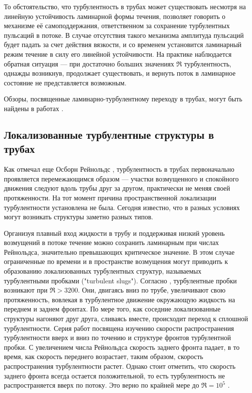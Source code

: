 То обстоятельство, что турбулентность в трубах может существовать несмотря на линейную устойчивость ламинарной формы течения, позволяет говорить о механизме её самоподдержания, ответственном за сохранение турбулентных пульсаций в потоке. В случае отсутствия такого механизма амплитуда пульсаций будет падать за счет действия вязкости, и со временем установится ламинарный режим течение в силу его линейной устойчивости. На практике наблюдается обратная ситуация --- при достаточно больших значениях $\Re$ турбулентность, однажды возникнув, продолжает существовать, и вернуть поток в ламинарное состояние не представляется возможным. 

Обзоры, посвященные ламинарно-турбулентному переходу в трубах, могут быть найдены в работах \cite{Kerswell2005, Eckhardt2007, Manneville2015, Manneville2016, Kreilos2014, Barkley2016}.



	\subsection{Локализованные турбулентные структуры в трубах} \label{local_structures}

Как отмечал еще Осборн Рейнольдс \cite{Reynolds1883}, турбулентность в трубах первоначально проявляется перемежающимся образом --- участки возмущенного и спокойного движения следуют вдоль трубы друг за другом, практически не меняя своей протяженности. На тот момент причина пространственной локализации турбулентности установлена не была. Сегодня известно, что в разных условиях могут возникать структуры заметно разных типов. 

Организуя плавный вход жидкости в трубу и поддерживая низкий уровень возмущений в потоке течение можно сохранить ламинарным при числах Рейнольдса, значительно превышающих критическое значение. В этом случае ограниченные по времени и в пространстве возмущения могут приводить к образованию локализованных турбулентных структур, называемых турбулентными пробками ("turbulent slugs"). Согласно \cite{Wygnanski1973}, турбулентные пробки возникают при $\Re > 3200$. Они, двигаясь вниз по трубе, увеличивают свою протяженность, вовлекая в турбулентное движение окружающую жидкость на переднем и заднем фронтах. По мере того, как соседние локализованные структуры нагоняют друг друга, сливаясь вместе, происходит переход к сплошной турбулентности. Серия работ посвящена изучению скорости распространения турбулентности вверх и вниз по точению \cite{Lindgren1969, Wygnanski1973, Nishi2008, Duguet2010, Barkley2015} и структуре фронтов турбулентной пробки. С увеличением числа Рейнольдса скорость заднего фронта падает, в то время, как скорость переднего возрастает, таким образом, скорость распространения турбулентности растет. Однако стоит отметить, что скорость заднего фронта всегда остается положительной, то есть турбулентность не распространяется вверх по потоку. Это верно по крайней мере до $\Re = 10^5$ \cite{Wygnanski1973}. 

